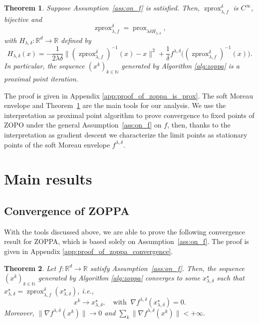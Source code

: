 \documentclass{article}
\newtheorem{theorem}{Theorem}
\newcommand{\R}{\mathbb{R}}
\newcommand{\prox}{\ensuremath{\operatorname{prox}}}
\newcommand{\zprox}{\ensuremath{\operatorname{zprox}}}
\begin{document}
\begin{theorem}\label{thm:zoppa_is_prox}
    Suppose Assumption~\ref{ass:on_f} is satisfied. Then, $\zprox^{\delta}_{\lambda, f}$ is $C^{\infty}$, bijective and \begin{equation}
     \zprox^{\delta}_{\lambda, f}= \prox_{\lambda \delta H_{\lambda,\delta}},
\end{equation}
with $H_{\lambda,\delta}:\R^d \to \R $ defined by
\begin{equation}
H_{\lambda,\delta}(x)= 
    -\frac{1}{2\lambda\delta}\big\|(\zprox^{\delta}_{\lambda, f})^{-1}(x)-x\big\|^2+\frac{1}{\delta}f^{\lambda,\delta}\!\big((\zprox^{\delta}_{\lambda, f})^{-1}(x)\big).
\label{eq:H_def}
\end{equation}
In particular, the sequence $(x^k)_{k\in\mathbb{N}}$ generated by
Algorithm \ref{alg:zoppa} is a proximal point iteration.
\end{theorem}
The proof is given in Appendix \ref{app:proof_of_zoppa_is_prox}. The soft Moreau envelope and Theorem~\ref{thm:zoppa_is_prox} are the main tools for our analysis. We use the interpretation as proximal point algorithm to prove convergence to fixed points of ZOPO under the general Assumption~\ref{ass:on_f} on $f$, then, thanks to the interpretation as gradient descent we characterize the limit points as stationary points of the soft Moreau envelope $f^{\lambda, \delta}$.

\section{Main results}\label{sec:main_results}

\subsection{Convergence of ZOPPA}
With the tools discussed above, we are able to prove the following convergence result for ZOPPA, which is based solely on Assumption~\ref{ass:on_f}. The proof is given in Appendix \ref{app:proof_of_zoppa_convergence}.

\begin{theorem}\label{thm:zoppa_convergence}
Let $f:\R^d\to \R$ satisfy Assumption~\ref{ass:on_f}. Then, the sequence $(x^k)_{k\in\mathbb{N}}$ generated by Algorithm \ref{alg:zoppa} converges to some $x_{\lambda,\delta}^\star$ such that $x_{\lambda,\delta}^\star=\zprox_{\lambda, f}^{\delta}(x_{\lambda,\delta}^\star)$, i.e.,
\[x^k \to x_{\lambda,\delta}^\star, \quad \text{with }\  \nabla f^{\lambda,\delta}(x_{\lambda,\delta}^\star)=0.\]
Moreover, \(\|\nabla f^{\lambda,\delta}(x^k)\|\to 0\) and  \(\sum_k \|\nabla f^{\lambda,\delta}(x^k)\|< +\infty.\)
\end{theorem}
\end{document}
